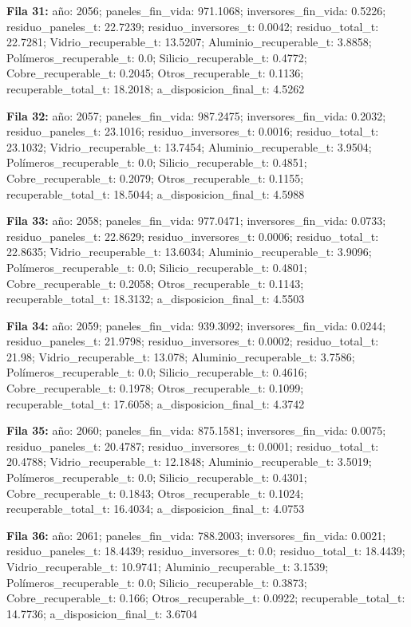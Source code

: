 {\footnotesize\textbf{Fila 31:} año: 2056; paneles\_fin\_vida: 971.1068; inversores\_fin\_vida: 0.5226; residuo\_paneles\_t: 22.7239; residuo\_inversores\_t: 0.0042; residuo\_total\_t: 22.7281; Vidrio\_recuperable\_t: 13.5207; Aluminio\_recuperable\_t: 3.8858; Polímeros\_recuperable\_t: 0.0; Silicio\_recuperable\_t: 0.4772; Cobre\_recuperable\_t: 0.2045; Otros\_recuperable\_t: 0.1136; recuperable\_total\_t: 18.2018; a\_disposicion\_final\_t: 4.5262\par}
{\footnotesize\textbf{Fila 32:} año: 2057; paneles\_fin\_vida: 987.2475; inversores\_fin\_vida: 0.2032; residuo\_paneles\_t: 23.1016; residuo\_inversores\_t: 0.0016; residuo\_total\_t: 23.1032; Vidrio\_recuperable\_t: 13.7454; Aluminio\_recuperable\_t: 3.9504; Polímeros\_recuperable\_t: 0.0; Silicio\_recuperable\_t: 0.4851; Cobre\_recuperable\_t: 0.2079; Otros\_recuperable\_t: 0.1155; recuperable\_total\_t: 18.5044; a\_disposicion\_final\_t: 4.5988\par}
{\footnotesize\textbf{Fila 33:} año: 2058; paneles\_fin\_vida: 977.0471; inversores\_fin\_vida: 0.0733; residuo\_paneles\_t: 22.8629; residuo\_inversores\_t: 0.0006; residuo\_total\_t: 22.8635; Vidrio\_recuperable\_t: 13.6034; Aluminio\_recuperable\_t: 3.9096; Polímeros\_recuperable\_t: 0.0; Silicio\_recuperable\_t: 0.4801; Cobre\_recuperable\_t: 0.2058; Otros\_recuperable\_t: 0.1143; recuperable\_total\_t: 18.3132; a\_disposicion\_final\_t: 4.5503\par}
{\footnotesize\textbf{Fila 34:} año: 2059; paneles\_fin\_vida: 939.3092; inversores\_fin\_vida: 0.0244; residuo\_paneles\_t: 21.9798; residuo\_inversores\_t: 0.0002; residuo\_total\_t: 21.98; Vidrio\_recuperable\_t: 13.078; Aluminio\_recuperable\_t: 3.7586; Polímeros\_recuperable\_t: 0.0; Silicio\_recuperable\_t: 0.4616; Cobre\_recuperable\_t: 0.1978; Otros\_recuperable\_t: 0.1099; recuperable\_total\_t: 17.6058; a\_disposicion\_final\_t: 4.3742\par}
{\footnotesize\textbf{Fila 35:} año: 2060; paneles\_fin\_vida: 875.1581; inversores\_fin\_vida: 0.0075; residuo\_paneles\_t: 20.4787; residuo\_inversores\_t: 0.0001; residuo\_total\_t: 20.4788; Vidrio\_recuperable\_t: 12.1848; Aluminio\_recuperable\_t: 3.5019; Polímeros\_recuperable\_t: 0.0; Silicio\_recuperable\_t: 0.4301; Cobre\_recuperable\_t: 0.1843; Otros\_recuperable\_t: 0.1024; recuperable\_total\_t: 16.4034; a\_disposicion\_final\_t: 4.0753\par}
{\footnotesize\textbf{Fila 36:} año: 2061; paneles\_fin\_vida: 788.2003; inversores\_fin\_vida: 0.0021; residuo\_paneles\_t: 18.4439; residuo\_inversores\_t: 0.0; residuo\_total\_t: 18.4439; Vidrio\_recuperable\_t: 10.9741; Aluminio\_recuperable\_t: 3.1539; Polímeros\_recuperable\_t: 0.0; Silicio\_recuperable\_t: 0.3873; Cobre\_recuperable\_t: 0.166; Otros\_recuperable\_t: 0.0922; recuperable\_total\_t: 14.7736; a\_disposicion\_final\_t: 3.6704\par}
